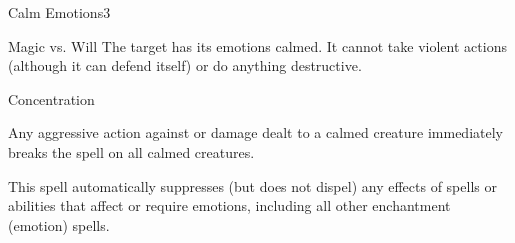\begin{spellsection}{Calm Emotions}{3}
    \begin{spellheader}
    \end{spellheader}
    \begin{spellcontent}
        \begin{spelltargetinginfo}
        \end{spelltargetinginfo}
        \begin{spelleffects}
            \begin{spellattack}{Magic vs. Will}
                \spellsuccess The target has its emotions calmed. It cannot take violent actions (although it can defend itself) or do anything destructive.
            \end{spellattack}
            \spelldur Concentration
        \end{spelleffects}
    \end{spellcontent}
    \begin{spellfooter}
        \spellnotes Any aggressive action against or damage dealt to a calmed creature immediately breaks the spell on all calmed creatures.

        This spell automatically suppresses (but does not dispel) any effects of spells or abilities that affect or require emotions, including all other enchantment (emotion) spells.
        \miscastyou
    \end{spellfooter}
\end{spellsection}

